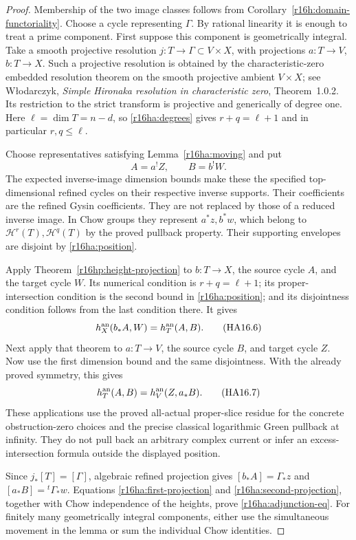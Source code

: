 \begin{proof}
Membership of the two image classes follows from
Corollary~\ref{r16h:domain-functoriality}. Choose a cycle representing
$\Gamma$. By rational linearity it is enough to treat a prime
component. First suppose this component is geometrically integral.
Take a smooth projective resolution
$j:T\to\Gamma\subset V\times X$, with projections
$a:T\to V$, $b:T\to X$. Such a projective resolution is obtained
by the characteristic-zero embedded resolution theorem on the
smooth projective ambient $V\times X$; see W\l odarczyk,
\emph{Simple Hironaka resolution in characteristic zero},
Theorem~1.0.2. Its restriction to the strict transform is
projective and generically of degree one. Here
$\ell=\dim T=n-d$, so \eqref{r16ha:degrees} gives
$r+q=\ell+1$ and in particular $r,q\leq\ell$.

Choose representatives satisfying Lemma~\ref{r16ha:moving} and put
\[
                 A=a^!Z,\qquad B=b^!W.
 \tag{HA16.5}\label{r16ha:refined-cycles}
\]
The expected inverse-image dimension bounds make these the
specified top-dimensional refined cycles on their respective
inverse supports. Their coefficients are the refined Gysin
coefficients. They are not replaced by those of a reduced
inverse image. In Chow groups they represent $a^*z,b^*w$,
which belong to $\mathcal H^r(T),\mathcal H^q(T)$ by the
proved pullback property. Their supporting envelopes are
disjoint by \eqref{r16ha:position}.

Apply Theorem~\ref{r16hp:height-projection} to $b:T\to X$,
the source cycle $A$, and the target cycle $W$. Its numerical
condition is $r+q=\ell+1$; its proper-intersection condition
is the second bound in \eqref{r16ha:position}; and its disjointness
condition follows from the last condition there. It gives
\[
                  h_X^{\rm an}(b_*A,W)=h_T^{\rm an}(A,B).
 \tag{HA16.6}\label{r16ha:first-projection}
\]
Next apply that theorem to $a:T\to V$, the source cycle $B$,
and target cycle $Z$. Now use the first dimension bound and
the same disjointness. With the already proved symmetry, this gives
\[
                  h_T^{\rm an}(A,B)=h_V^{\rm an}(Z,a_*B).
 \tag{HA16.7}\label{r16ha:second-projection}
\]
These applications use the proved all-actual proper-slice
residue for the concrete obstruction-zero choices and the
precise classical logarithmic Green pullback at infinity.
They do not pull back an arbitrary complex current or infer
an excess-intersection formula outside the displayed position.

Since $j_*[T]=[\Gamma]$, algebraic refined projection gives
$[b_*A]=\Gamma_*z$ and $[a_*B]={}^t\Gamma_*w$.
Equations \eqref{r16ha:first-projection} and
\eqref{r16ha:second-projection}, together with Chow independence
of the heights, prove \eqref{r16ha:adjunction-eq}.
For finitely many geometrically integral components, either use
the simultaneous movement in the lemma or sum the individual
Chow identities.


\end{proof}
